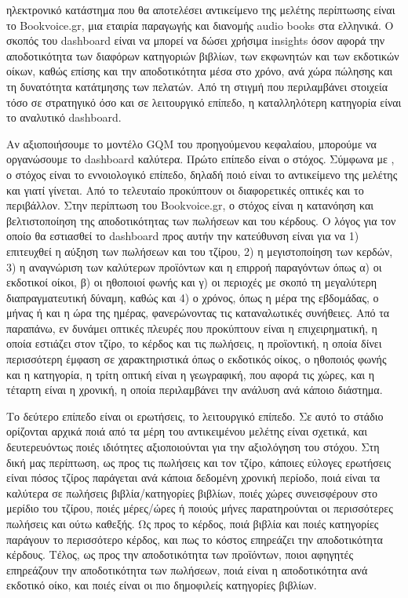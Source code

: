 \documentclass{article}
\begin{document}
 ηλεκτρονικό κατάστημα που θα αποτελέσει αντικείμενο της μελέτης περίπτωσης είναι το Bookvoice.gr, μια εταιρία παραγωγής και διανομής audio books στα ελληνικά. Ο σκοπός του dashboard είναι να μπορεί να δώσει χρήσιμα insights όσον αφορά την αποδοτικότητα των διαφόρων κατηγοριών βιβλίων, των εκφωνητών και των εκδοτικών οίκων, καθώς επίσης και την αποδοτικότητα μέσα στο χρόνο, ανά χώρα πώλησης και τη δυνατότητα κατάτμησης των πελατών. Από τη στιγμή που περιλαμβάνει στοιχεία τόσο σε στρατηγικό όσο και σε λειτουργικό επίπεδο, η καταλληλότερη κατηγορία είναι το αναλυτικό dashboard.

Αν αξιοποιήσουμε το μοντέλο GQM του προηγούμενου κεφαλαίου, μπορούμε να οργανώσουμε το dashboard καλύτερα. Πρώτο επίπεδο είναι ο στόχος. Σύμφωνα με \cite{janes2013effective}, ο στόχος είναι το εννοιολογικό επίπεδο, δηλαδή ποιό είναι το αντικείμενο της μελέτης και γιατί γίνεται. Από το τελευταίο προκύπτουν οι διαφορετικές οπτικές και το περιβάλλον. Στην περίπτωση του Bookvoice.gr, ο στόχος είναι η κατανόηση και βελτιστοποίηση της αποδοτικότητας των πωλήσεων και του κέρδους. Ο λόγος για τον οποίο θα εστιασθεί το dashboard προς αυτήν την κατεύθυνση είναι για να 1) επιτευχθεί η αύξηση των πωλήσεων και του τζίρου, 2) η μεγιστοποίηση των κερδών, 3) η αναγνώριση των καλύτερων προϊόντων και η επιρροή παραγόντων όπως α) οι εκδοτικοί οίκοι, β) οι ηθοποιοί φωνής και γ) οι περιοχές με σκοπό τη μεγαλύτερη διαπραγματευτική δύναμη, καθώς και 4) ο χρόνος, όπως η μέρα της εβδομάδας, ο μήνας ή και η ώρα της ημέρας, φανερώνοντας τις καταναλωτικές συνήθειες. Από τα παραπάνω, εν δυνάμει οπτικές πλευρές που προκύπτουν είναι η επιχειρηματική, η οποία εστιάζει στον τζίρο, το κέρδος και τις πωλήσεις, η προϊοντική, η οποία δίνει περισσότερη έμφαση σε χαρακτηριστικά όπως ο εκδοτικός οίκος, ο ηθοποιός φωνής και η κατηγορία, η τρίτη οπτική είναι η γεωγραφική, που αφορά τις χώρες, και η τέταρτη είναι η χρονική, η οποία περιλαμβάνει την ανάλυση ανά κάποιο διάστημα.

Το δεύτερο επίπεδο είναι οι ερωτήσεις, το λειτουργικό επίπεδο. Σε αυτό το στάδιο ορίζονται αρχικά ποιά από τα μέρη του αντικειμένου μελέτης είναι σχετικά, και δευτερευόντως ποιές ιδιότητες αξιοποιούνται για την αξιολόγηση του στόχου. Στη δική μας περίπτωση, ως προς τις πωλήσεις και τον τζίρο, κάποιες εύλογες ερωτήσεις είναι πόσος τζίρος παράγεται ανά κάποια δεδομένη χρονική περίοδο, ποιά είναι τα καλύτερα σε πωλήσεις βιβλία/κατηγορίες βιβλίων, ποιές χώρες συνεισφέρουν στο μερίδιο του τζίρου, ποιές μέρες/ώρες ή ποιούς μήνες παρατηρούνται οι περισσότερες πωλήσεις και ούτω καθεξής. Ως προς το κέρδος, ποιά βιβλία και ποιές κατηγορίες παράγουν το περισσότερο κέρδος, και πως το κόστος επηρεάζει την αποδοτικότητα κέρδους. Τέλος, ως προς την αποδοτικότητα των προϊόντων, ποιοι αφηγητές επηρεάζουν την αποδοτικότητα των πωλήσεων, ποιά είναι η αποδοτικότητα ανά εκδοτικό οίκο, και ποιές είναι οι πιο δημοφιλείς κατηγορίες βιβλίων.
\end{document}

